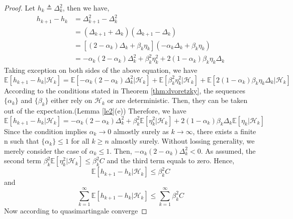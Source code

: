   \begin{proof}
    Let $h_{k} \triangleq \Delta_{k}^{2}$, then we have,
    \begin{align*}
      h_{k+1} - h_{k} & = \Delta_{k+1}^{2} - \Delta_{k}^{2}                                                                                     \\
                      & = (\Delta_{k+1}+\Delta_{k})(\Delta_{k+1}-\Delta_{k})                                                                    \\
                      & = \left[(2-\alpha_{k}) \Delta_{k}+\beta_{k} \eta_{k}\right](-\alpha_{k} \Delta_{k}+\beta_{k} \eta_{k})                  \\
                      & = -\alpha_{k}(2-\alpha_{k}) \Delta_{k}^{2} + \beta_{k}^{2} \eta_{k}^{2} + 2(1-\alpha_{k}) \beta_{k} \eta_{k} \Delta_{k}
    \end{align*}
    Taking exception on both sides of the above equation, we have \[\mathbb{E}[h_{k+1} - h_{k}|\mathcal{H}_{k}] =
      \mathbb{E}[-\alpha_{k}(2-\alpha_{k}) \Delta_{k}^{2}|\mathcal{H}_{k}] + \mathbb{E}[\beta_{k}^{2}
        \eta_{k}^{2}|\mathcal{H}_{k}] + \mathbb{E}[2(1-\alpha_{k}) \beta_{k} \eta_{k} \Delta_{k}|\mathcal{H}_{k}] \]
    According to the conditions stated in Theorem \ref{thm:dvoretzky}, the sequences $\{\alpha_{k}\}$ and $\{\beta_{k}\}$
    either rely on $\mathcal{H}_{k}$ or are deterministic. Then, they can be taken out of the expectation.(Lemma
    \ref{le2}(e)) Therefore, we have
    \begin{equation}
      \label{equ:hk}
      \mathbb{E}[h_{k+1} - h_{k}|\mathcal{H}_{k}] = -\alpha_{k}(2-\alpha_{k}) \Delta_{k}^{2} + \beta_{k}^{2}
      \mathbb{E}[\eta_{k}^{2}|\mathcal{H}_{k}] + 2(1-\alpha_{k}) \beta_{k} \Delta_{k}\mathbb{E}[\eta_{k} |\mathcal{H}_{k}]
    \end{equation}
    Since the condition implies $\alpha_{k} \to 0$ almostly surely as $k\to \infty$, there exists a finite n such that
    $\{\alpha_{k}\} \le 1$ for all $k\ge n$ almostly surely. Without lossing generality, we merely consider the case of
    $\alpha_{k} \le 1$. Then, $-\alpha_{k}(2-\alpha_{k}) \Delta_{k}^{2} <0$. As assumed, the second term $\beta_{k}^{2}
      \mathbb{E}[\eta_{k}^{2}|\mathcal{H}_{k}] \le \beta_{k}^{2}C$ and the third term equals to zero. Hence, \[
      \mathbb{E}[h_{k+1} - h_{k}|\mathcal{H}_{k}] \le \beta_{k}^{2}C \] and \[\sum_{k=1}^{\infty}{\mathbb{E}[h_{k+1} -
        h_{k}|\mathcal{H}_{k}]} \le \sum_{k=1}^{\infty}{\beta_{k}^{2}C}\] Now according to quasimartingale converge

\end{proof}
